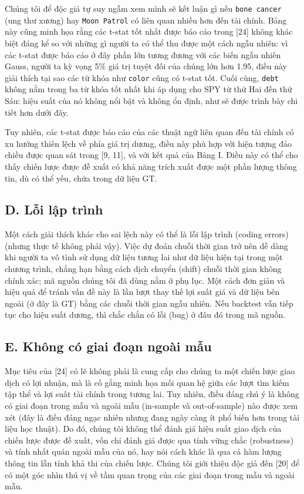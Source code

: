 Chúng tôi để độc giả tự suy ngẫm xem mình sẽ kết luận gì nếu \texttt{bone cancer} (ung thư xương) hay \texttt{Moon Patrol} có liên quan nhiều hơn đến tài chính. Bảng này cũng minh họa rằng các t-stat tốt nhất được báo cáo trong [24] không khác biệt đáng kể so với những gì người ta có thể thu được một cách ngẫu nhiên: vì các t-stat được báo cáo ở đây phần lớn tương đương với các biến ngẫu nhiên Gauss, người ta kỳ vọng 5\% giá trị tuyệt đối của chúng lớn hơn 1.95, điều này giải thích tại sao các từ khóa như \texttt{color} cũng có t-stat tốt. Cuối cùng, \texttt{debt} không nằm trong ba từ khóa tốt nhất khi áp dụng cho SPY từ thứ Hai đến thứ Sáu: hiệu suất của nó không nổi bật và không ổn định, như sẽ được trình bày chi tiết hơn dưới đây.

Tuy nhiên, các t-stat được báo cáo của các thuật ngữ liên quan đến tài chính có xu hướng thiên lệch về phía giá trị dương, điều này phù hợp với hiện tượng đảo chiều được quan sát trong [9, 11], và với kết quả của Bảng I. Điều này có thể cho thấy chiến lược được đề xuất có khả năng trích xuất được một phần lượng thông tin, dù có thể yếu, chứa trong dữ liệu GT.

\subsection*{D. Lỗi lập trình}

Một cách giải thích khác cho sai lệch này có thể là lỗi lập trình (coding errors) (nhưng thực tế không phải vậy). Việc dự đoán chuỗi thời gian trở nên dễ dàng khi người ta vô tình sử dụng dữ liệu tương lai như dữ liệu hiện tại trong một chương trình, chẳng hạn bằng cách dịch chuyển (shift) chuỗi thời gian không chính xác; mã nguồn chúng tôi đã dùng nằm ở phụ lục. Một cách đơn giản và hiệu quả để tránh vấn đề này là lần lượt thay thế lợi suất giá và dữ liệu bên ngoài (ở đây là GT) bằng các chuỗi thời gian ngẫu nhiên. Nếu backtest vẫn tiếp tục cho hiệu suất dương, thì chắc chắn có lỗi (bug) ở đâu đó trong mã nguồn.

\subsection*{E. Không có giai đoạn ngoài mẫu}

Mục tiêu của [24] có lẽ không phải là cung cấp cho chúng ta một chiến lược giao dịch có lợi nhuận, mà là cố gắng minh họa mối quan hệ giữa các lượt tìm kiếm tập thể và lợi suất tài chính trong tương lai. Tuy nhiên, điều đáng chú ý là không có giai đoạn trong mẫu và ngoài mẫu (in-sample và out-of-sample) nào được xem xét (đây là điều đáng ngạc nhiên nhưng đang ngày càng ít phổ biến hơn trong tài liệu học thuật). Do đó, chúng tôi không thể đánh giá hiệu suất giao dịch của chiến lược được đề xuất, vốn chỉ đánh giá được qua tính vững chắc (robustness) và tính nhất quán ngoài mẫu của nó, hay nói cách khác là qua cả hàm lượng thông tin lẫn tính khả thi của chiến lược. Chúng tôi giới thiệu độc giả đến [20] để có một góc nhìn thú vị về tầm quan trọng của các giai đoạn trong mẫu và ngoài mẫu.

